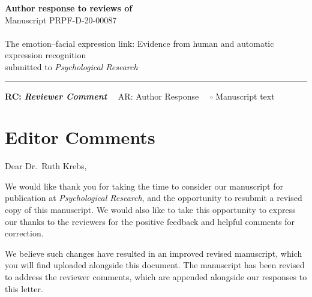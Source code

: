 \documentclass[]{article}
\begin{document}
{\Large\bf Author response to reviews of}\\[1em]
Manuscript PRPF-D-20-00087\\ \\
{\Large The emotion--facial expression link: Evidence from human and automatic expression recognition}\\[1em]

{submitted to \it Psychological Research }\\
\hrule

\hfill {\bfseries RC:} \textbf{\textit{Reviewer Comment}}\(\quad\) AR: Author Response \(\quad\square\) Manuscript text

\vspace{2em}

\hypertarget{editor-comments}{%
\section{Editor Comments}\label{editor-comments}}


Dear Dr.~Ruth Krebs,

We would like thank you for taking the time to consider our manuscript for publication at \emph{Psychological Research}, and the opportunity to resubmit a revised copy of this manuscript. We would also like to take this opportunity to express our thanks to the reviewers for the positive feedback and helpful comments for correction.

We believe such changes have resulted in an improved revised manuscript, which you will find uploaded alongside this document. The manuscript has been revised to address the reviewer comments, which are appended alongside our responses to this letter.
\end{document}
